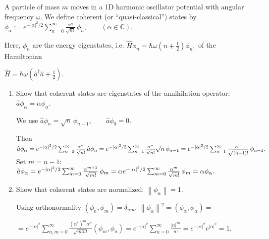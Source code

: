 \documentclass[11pt,a4paper]{scrartcl}
\newcommand{\norm}[1]{\left\lVert #1 \right\rVert}
\begin{document}
A particle of mass $m$ moves in a 1D harmonic oscillator potential with angular frequency $\omega$. We define coherent (or ``quasi-classical'') states by
$
\phi_\alpha := e^{-|\alpha|^2/2}\sum_{n=0}^{\infty}\frac{\alpha^n}{\sqrt{n!}}\,\phi_n,
\qquad (\alpha \in \mathbb{C}).
$

Here, $\phi_n$ are the energy eigenstates, i.e.
$
\hat H \phi_n = \hbar\omega\left(n+\frac{1}{2}\right)\phi_n,
$
of the Hamiltonian

$\hat H = \hbar\omega\left(\hat a^\dagger \hat a + \frac{1}{2}\right)$.
\begin{enumerate}[label=(\alph*)]
    \item Show that coherent states are eigenstates of the annihilation operator:
    $
    \hat a \phi_\alpha = \alpha \phi_\alpha.
    $

    \begin{calculationbox}
    We use
    $
    \hat a \phi_n = \sqrt{n}\,\phi_{n-1}, \qquad \hat a\phi_0=0.
    $
    
    Then
    $
        \hat a \phi_\alpha
        = e^{-|\alpha|^2/2}\sum_{n=0}^{\infty}\frac{\alpha^n}{\sqrt{n!}}\,\hat a\phi_n \\
        = e^{-|\alpha|^2/2}\sum_{n=1}^{\infty}\frac{\alpha^n}{\sqrt{n!}}\sqrt{n}\,\phi_{n-1} \\
        = e^{-|\alpha|^2/2}\sum_{n=1}^{\infty}\frac{\alpha^n}{\sqrt{(n-1)!}}\,\phi_{n-1}.
    $
    Set $m=n-1$:
    $
        \hat a \phi_\alpha
        = e^{-|\alpha|^2/2}\sum_{m=0}^{\infty}\frac{\alpha^{m+1}}{\sqrt{m!}}\,\phi_m \\
        = \alpha e^{-|\alpha|^2/2}\sum_{m=0}^{\infty}\frac{\alpha^m}{\sqrt{m!}}\,\phi_m \\
        = \alpha \phi_\alpha.
    $
    \end{calculationbox}

    \item Show that coherent states are normalized: $\norm{\phi_\alpha}=1$.

    \begin{solutionbox}
    Using orthonormality $(\phi_n,\phi_m)=\delta_{nm}$,
        $\norm{\phi_\alpha}^2= (\phi_\alpha,\phi_\alpha) = $ 
        
        $= e^{-|\alpha|^2} \sum_{n,m=0}^{\infty} \frac{(\alpha^*)^m \alpha^n}{\sqrt{m!n!}}(\phi_m,\phi_n) = e^{-|\alpha|^2}\sum_{n=0}^{\infty} \frac{|\alpha|^{2n}}{n!} = e^{-|\alpha|^2} e^{|\alpha|^2} = 1$.
    \end{solutionbox}


\end{enumerate}
\end{document}

